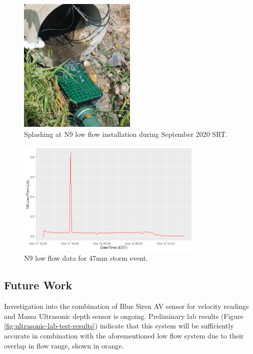 \begin{figure}[ht!]
	\centering
	\includegraphics[width=0.5\textwidth]{gfx/chapter-instrumentation/lf-n9-action.jpg}
	\caption{Splashing at N9 low flow installation during September 2020 SRT.}
	\label{fig:low-flow-splashing}
\end{figure}

\begin{figure}[ht!]
	\centering
	\includegraphics[width=0.8\textwidth]{gfx/chapter-instrumentation/low-flow.png}
	\caption{N9 low flow data for 47mm storm event.}
	\label{fig:low-flow-data}
\end{figure}

\subsection{Future Work}

Investigation into the combination of Blue Siren AV sensor for velocity readings and Massa Ultrasonic depth sensor is ongoing.
Preliminary lab results (Figure \ref{fig:ultrasonic-lab-test-results}) indicate that this system will be sufficiently accurate in combination with the aforementioned low flow system due to their overlap in flow range, shown in orange.

